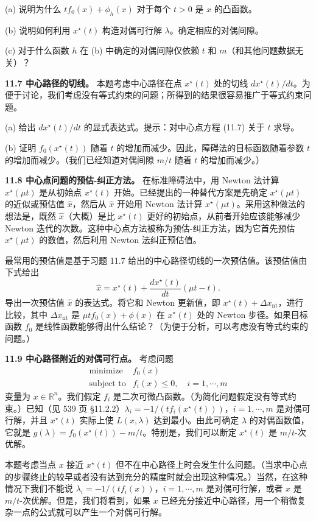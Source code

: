 \documentclass[UTF8, 12pt, fontset=fandol, oneside]{ctexart}
\begin{document}
(a) 说明为什么 $tf_0(x)+\phi_h(x)$ 对于每个 $t>0$ 是 $x$ 的凸函数。

(b) 说明如何利用 $x^\star(t)$ 构造对偶可行解 $\lambda$。确定相应的对偶间隙。

(c) 对于什么函数 $h$ 在 (b) 中确定的对偶间隙仅依赖 $t$ 和 $m$（和其他问题数据无关）？

\noindent\textbf{11.7 中心路径的切线。} 本题考虑中心路径在点 $x^\star(t)$ 处的切线 $dx^\star(t)/dt$。为便于讨论，我们考虑没有等式约束的问题；所得到的结果很容易推广于等式约束问题。

(a) 给出 $dx^\star(t)/dt$ 的显式表达式。提示：对中心点方程 (11.7) 关于 $t$ 求导。

(b) 证明 $f_0(x^\star(t))$ 随着 $t$ 的增加而减少。因此，障碍法的目标函数随着参数 $t$ 的增加而减少。（我们已经知道对偶间隙 $m/t$ 随着 $t$ 的增加而减少。）

\noindent\textbf{11.8 中心点问题的预估-纠正方法。} 在标准障碍法中，用 Newton 法计算 $x^\star(\mu t)$ 是从初始点 $x^\star(t)$ 开始。已经提出的一种替代方案是先确定 $x^\star(\mu t)$ 的近似或预估值 $\hat{x}$，然后从 $\hat{x}$ 开始用 Newton 法计算 $x^\star(\mu t)$。采用这种做法的想法是，既然 $\hat{x}$（大概）是比 $x^\star(t)$ 更好的初始点，从前者开始应该能够减少 Newton 迭代的次数。这种中心点方法被称为预估-纠正方法，因为它首先预估 $x^\star(\mu t)$ 的数值，然后利用 Newton 法纠正预估值。

最常用的预估值是基于习题 11.7 给出的中心路径切线的一次预估值。该预估值由下式给出
\[
\hat{x}=x^\star(t)+\frac{dx^\star(t)}{dt}(\mu t-t).
\]
导出一次预估值 $\hat{x}$ 的表达式。将它和 Newton 更新值，即 $x^\star(t)+\Delta x_{\mathrm{nt}}$，进行比较，其中 $\Delta x_{\mathrm{nt}}$ 是 $\mu t f_0(x)+\phi(x)$ 在 $x^\star(t)$ 处的 Newton 步径。如果目标函数 $f_0$ 是线性函数能够得出什么结论？（为便于分析，可以考虑没有等式约束的问题。）

\noindent\textbf{11.9 中心路径附近的对偶可行点。} 考虑问题
\[
\begin{array}{ll}
\text{minimize} & f_0(x)\\
\text{subject to} & f_i(x)\leq 0,\quad i=1,\cdots,m
\end{array}
\]
变量为 $x\in\mathbb{R}^n$。我们假定 $f_i$ 是二次可微凸函数。（为简化问题假定没有等式约束。）已知（见 539 页 \S11.2.2）$\lambda_i=-1/(tf_i(x^\star(t)))$，$i=1,\cdots,m$ 是对偶可行解，并且 $x^\star(t)$ 实际上使 $L(x,\lambda)$ 达到最小。由此可确定 $\lambda$ 的对偶函数值，它就是 $g(\lambda)=f_0(x^\star(t))-m/t$。特别是，我们可以断定 $x^\star(t)$ 是 $m/t$-次优解。

本题考虑当点 $x$ 接近 $x^\star(t)$ 但不在中心路径上时会发生什么问题。（当求中心点的步骤终止的较早或者没有达到充分的精度时就会出现这种情况。）当然，在这种情况下我们不能说 $\lambda_i=-1/(tf_i(x))$，$i=1,\cdots,m$ 是对偶可行解，或者 $x$ 是 $m/t$-次优解。但是，我们将看到，如果 $x$ 已经充分接近中心路径，用一个稍微复杂一点的公式就可以产生一个对偶可行解。
\end{document}

